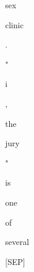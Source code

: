 \documentclass[varwidth=150mm]{standalone}
\begin{document}
\begin{CJK*}{UTF8}{gbsn}
{{{\colorbox{red!0.0}{\strut sex} \colorbox{red!0.0}{\strut clinic} \colorbox{red!0.0}{\strut .} \colorbox{red!0.0}{\strut "} \colorbox{red!9.80978012084961}{\strut i} \colorbox{red!5.081591606140137}{\strut ,} \colorbox{red!1.0490639209747314}{\strut the} \colorbox{red!3.8639349937438965}{\strut jury} \colorbox{red!0.0}{\strut "} \colorbox{red!3.6650664806365967}{\strut is} \colorbox{red!1.222970724105835}{\strut one} \colorbox{red!0.0}{\strut of} \colorbox{red!0.0}{\strut several} \colorbox{red!0.0}{\strut [SEP]}
}}}
\end{CJK*}
\end{document}
